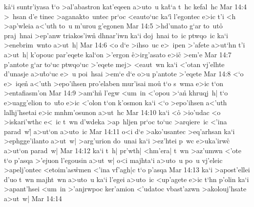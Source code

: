 k\r{a}`i
suntr'iyasa
\r{t}`o
>al'abastron
kat'eqeen
a>uto~u
ka\r{t}`a
t~hc
kefal~hc\bibvsend
\vs Mar 14:4
>~hsan
d'e
tinec
>aganakto~untec
pr`oc
<eauto`uc
ka`i\r{}
l'egontec
e>ic
t'i
<h
>ap'wleia
a<'uth
to~u
m'urou
g'egonen\bibvsend
\vs Mar 14:5
>hd'unato
g`ar
to~ut\r{o}
praj~hnai
>ep'anw
triakos'iwn\r{}
dhnar'iwn
ka`i
doj~hnai
to~ic
ptwqo~ic
ka`i
>enebrim~wnto
a>ut~h|\bibvsend
\vs Mar 14:6
<o
d`e
>ihso~uc
e>~ipen
>'afete
a>ut`hn
t'i
a>ut~h|
k'opouc
par'eqete
kal`on
>'ergon
\r{e}>irg'asato
e>ic\r{}
>em'e\bibvsend
\vs Mar 14:7
p'antote
g`ar
to`uc
ptwqo`uc
>'eqete
mej>
<eaut~wn
ka`i
<'otan
vj'elhte
d'unasje
a>u\r{t}o`uc
e>~u
poi~hsai
>em`e
d`e
o>u
p'antote
>'eqete\bibvsend
\vs Mar 14:8
<`o
e>~iqen\r{}
a<'uth
>epo'ihsen
pro'elaben
mur'isai
mou\r{}
t`o
s~wma
e>ic
t`on
>entafiasm'on\bibvsend
\vs Mar 14:9
>am`h\r{n}
l'egw
<um~in
<'opou
>`a\r{n}
khruqj~h|
t`o
e>uagg'elion
to~u\r{t}o
e>ic
<'olon
t`on
k'osmon
ka`i
<`o
>epo'ihsen
a<'uth
lalhj'hsetai
e>ic
mnhm'osunon
a>ut~hc\bibvsend
\vs Mar 14:10
ka`i
<o\r{}
>io'udac
<o
>iskari'wthc
e<~ic
t~wn
d'wdeka
>ap~hljen
pr`oc
to`uc
>arqiere~ic
<'ina
parad~w|\r{}
a>ut`on
a>uto~ic\bibvsend
\vs Mar 14:11
o<i
d`e
>ako'usantec
>eq'arhsan
ka`i
>ephgge'ilanto
a>ut~w|
>arg'urion
do~unai
ka`i
>ez'htei
p~wc
e>uka'irwc\r{}
a>ut`on
parad~w|\bibvsend
\vs Mar 14:12
ka`i
t~h|
pr'wth|
<hm'era|
t~wn
>az'umwn
<'ote
t`o
p'asqa
>'ejuon
l'egousin
a>ut~w|
o<i
majhta`i
a>uto~u
po~u
vj'eleic
>apelj'ontec
<etoim'as\r{w}men
<'ina
vf'agh|c
t`o
p'asqa\bibvsend
\vs Mar 14:13
ka`i
>apost'ellei
d'uo
t~wn
majht~wn
a>uto~u
ka`i
l'egei
a>uto~ic
<up'agete
e>ic
t`hn
p'olin
ka`i
>apant'hsei
<um~in
>'anjrwpoc
ker'amion
<'udatoc
vbast'azwn
>akolouj'hsate
a>ut~w|\bibvsend
\vs Mar 14:14
